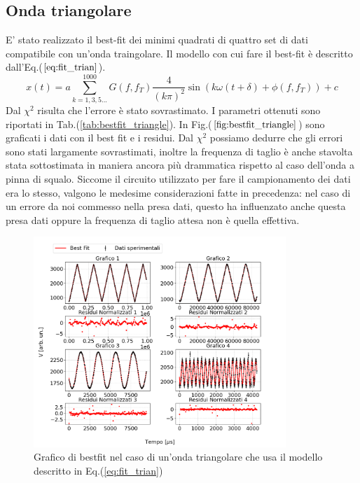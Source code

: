 \documentclass{article}
\begin{document}
    \subsection{Onda triangolare}
        E' stato realizzato il best-fit dei minimi quadrati
        di quattro set di dati compatibile con un'onda traingolare.
         Il modello con cui fare il best-fit è descritto dall'Eq.($\ref{eq:fit_trian}$).
            \begin{equation}
                x(t) = a\sum_{k=1,3,5...}^{1000} G(f,f_T)\frac{4}{(k\pi)^2}\sin\left(k\omega (t+\delta)+\phi(f,f_T)\right) +c
                \label{eq:fit_trian}
            \end{equation} 
        Dal $\chi^2$ risulta che l'errore è stato sovrastimato. 
        I parametri ottenuti sono riportati in Tab.(\ref{tab:bestfit_triangle}).%
        In Fig.($\ref{fig:bestfit_triangle}$) sono graficati i dati con il best fit e 
        i residui. Dal $\chi^2$ possiamo dedurre che gli errori sono stati largamente sovrastimati, inoltre la frequenza di taglio è anche stavolta stata sottostimata in maniera ancora più drammatica rispetto al caso dell'onda a pinna di squalo.
        Siccome il circuito utilizzato per fare il campionamento dei dati era lo stesso, valgono le medesime considerazioni fatte in precedenza: nel caso di un errore
        da noi commesso nella presa dati, questo ha influenzato anche questa presa dati oppure la frequenza di taglio attesa non è quella effettiva.

            \begin{figure}[H]            
                \centering
                \includegraphics[width=0.85\textwidth]{bestfit_triangle.png} %
                    \caption{Grafico di bestfit nel caso di un'onda triangolare che usa il modello descritto in Eq.(\ref{eq:fit_trian})
                }
                \label{fig:bestfit_triangle}
            \end{figure}    
\end{document}
